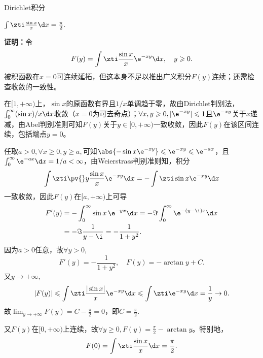 \begin{example}{Dirichlet积分}{}
	\begin{center}
		$\int\zti\frac{\sin x}x\d x=\frac{\pi}2.$
	\end{center}
	\textbf{证明：}令
	\[
		F(y)=\int\zti\frac{\sin x}x\e^{-xy}\d x,\quad y\geqslant 0.
	\]
	被积函数在$x=0$可连续延拓，但这本身不足以推出广义积分$F(y)$连续；还需检查收敛的一致性。

	在$[1,+\infty)$上，$\sin x$的原函数有界且$1/x$单调趋于零，故由Dirichlet判别法，$\int_0^\infty(\sin x)/x\d x$收敛（$x=0$为可去奇点）；$\forall x,y\geqslant 0,|\e^{-xy}|\leqslant 1$且$\e^{-xy}$关于$x$递减，由Abel判别准则可知$F(y)$关于$y\in[0,+\infty)$一致收敛，因此$F(y)$在该区间连续，包括端点$y=0$。

	任取$a>0,\forall x\geqslant 0,y\geqslant a,$可知$\abs{-\sin x\e^{-xy}}\leqslant \e^{-xy}\leqslant \e^{-ax}$，且$\int_0^\infty\e^{-ax}\d x=1/a<\infty$，由Weierstrass判别准则知，积分
	\[
		\int\zti\pv {}y\frac{\sin x}x\e^{-xy}\d x=-\int\zti\sin x\e^{-xy}\d x
	\]
	一致收敛，因此$F(y)$在$[a,+\infty)$上可导
	\begin{align*}
        F'(y)&=-\int_0^\infty\sin x\,\e^{-yx}\d x
        =-\Im\int_0^\infty\e^{-(y-\i)x}\d x\\
        &=-\Im\frac1{y-\i}=-\frac1{1+y^2}.
    \end{align*}
	因为$a>0$任意，故$\forall y>0,$
	\[
		F'(y)=-\frac1{1+y^2},\quad F(y)=-\arctan y+C.
	\]
	又$y\to+\infty,$
	\[
		|F(y)|\leqslant\int\zti\frac{|\sin x|}x\e^{-xy}\d x\leqslant\int\zti\e^{-xy}\d x=\frac1y\to0.
	\]
	故$\lim_{y\to+\infty}F(y)=C-\frac{\pi}2=0$，即$C=\frac{\pi}2.$

	又$F(y)$在$[0,+\infty)$上连续，故$\forall y\geqslant 0,F(y)=\frac{\pi}2-\arctan y$。特别地，
	\[
		F(0)=\int\zti\frac{\sin x}x\d x=\frac{\pi}2.
	\]
\end{example}
\newpage
